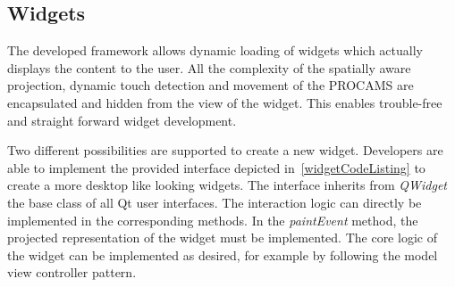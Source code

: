 \pagebreak
\subsection{Widgets}\label{sec:widget}
The developed framework allows dynamic loading of widgets which actually displays the content to the user. 
All the complexity of the spatially aware projection, dynamic touch detection and movement of the PROCAMS are encapsulated and hidden from the view of the widget. This enables trouble-free and straight forward widget development. 

Two different possibilities are supported to create a new widget. Developers are able to implement the provided interface depicted in~\autoref{widgetCodeListing} to create a more desktop like looking widgets. The interface inherits from \textit{QWidget} the base class of all Qt user interfaces. The interaction logic can directly be implemented in the corresponding methods. In the \textit{paintEvent} method, the projected representation of the widget must be implemented. The core logic of the widget can be implemented as desired, for example by following the model view controller pattern.

